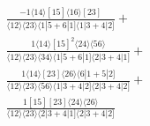 \documentclass[varwidth, border=5pt]{standalone}
\begin{document}
\begin{my}
$\begin{gathered}
\scriptscriptstyle\frac{-1⟨14⟩[15]⟨16⟩[23]}{⟨12⟩⟨23⟩⟨1|5+6|1]⟨1|3+4|2]}+\\
\scriptscriptstyle\frac{1⟨14⟩[15]^2⟨24⟩⟨56⟩}{⟨12⟩⟨23⟩⟨34⟩⟨1|5+6|1]⟨2|3+4|1]}+\\
\scriptscriptstyle\frac{1⟨14⟩[23]⟨26⟩⟨6|1+5|2]}{⟨12⟩⟨23⟩⟨56⟩⟨1|3+4|2]⟨2|3+4|2]}+\\
\scriptscriptstyle\frac{1[15][23]⟨24⟩⟨26⟩}{⟨12⟩⟨23⟩⟨2|3+4|1]⟨2|3+4|2]}\phantom{+}
\end{gathered}$
\end{my}
\end{document}
